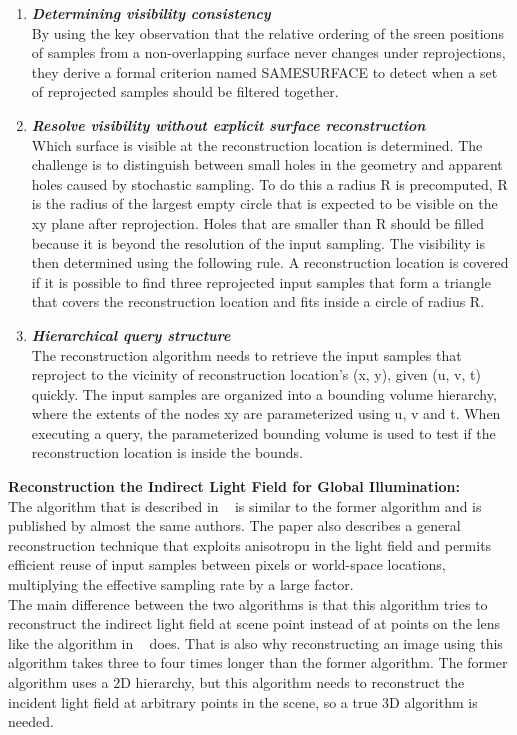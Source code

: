 \begin{enumerate}
    
  \item \textit{\textbf{Determining visibility consistency}} \\
    By using the key observation that the relative ordering of the sreen positions of samples from a non-overlapping surface never changes under reprojections, 
    they derive a formal criterion named SAMESURFACE to detect when a set of reprojected samples should be filtered together.
  \item \textit{\textbf{Resolve visibility without explicit surface reconstruction}} \\
    Which surface is visible at the reconstruction location is determined. 
    The challenge is to distinguish between small holes in the geometry and apparent holes caused by stochastic sampling. 
    To do this a radius R is precomputed, R is the radius of the largest empty circle that is expected to be visible on the xy plane after reprojection. 
    Holes that are smaller than R should be filled because it is beyond the resolution of the input sampling. 
    The visibility is then determined using the following rule. 
    A reconstruction location is covered if it is possible to find three reprojected input samples that form a triangle that covers the reconstruction location and fits inside a circle of radius R.
  \item \textit{\textbf{Hierarchical query structure}} \\
    The reconstruction algorithm needs to retrieve the input samples that reproject to the vicinity of reconstruction location’s (x, y), given (u, v, t) quickly.
    The input samples are organized into a bounding volume hierarchy, where the extents of the nodes xy are parameterized using u, v and t. 
    When executing a query, the parameterized bounding volume is used to test if the reconstruction location is inside the bounds.
\end{enumerate}

\textbf{Reconstruction the Indirect Light Field for Global Illumination:} \\
The algorithm that is described in ~\cite{Lehtinen:2012:RIL:2185520.2185547} is similar to the former algorithm and is published by almost the same authors.
The paper also describes a general reconstruction technique that exploits anisotropu in the light field and permits efficient reuse of input samples between pixels or world-space locations, 
multiplying the effective sampling rate by a large factor.
\\
The main difference between the two algorithms is that this algorithm tries to reconstruct the indirect light field at scene point instead of at points on the lens like the algorithm in ~\cite{Lehtinen2011sg} does.
That is also why reconstructing an image using this algorithm takes three to four times longer than the former algorithm. 
The former algorithm uses a 2D hierarchy, but this algorithm needs to reconstruct the incident light field at arbitrary points in the scene, so a true 3D algorithm is needed.
\\

